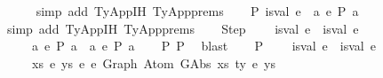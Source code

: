 \begin{isabellebody}
\ \ \ \ \isamarkupfalse%
\ {\isacharparenleft}{\kern0pt}simp\ add{\isacharcolon}{\kern0pt}\ TyApp{\isachardot}{\kern0pt}IH{\isacharparenleft}{\kern0pt}{}{\isacharparenright}{\kern0pt}\ TyApp{\isachardot}{\kern0pt}prems{\isacharparenright}{\kern0pt}\isanewline
\ \ \isamarkupfalse%
\ P{}{\isacharcolon}{\kern0pt}\ {\isachardoublequoteopen}is{\isacharunderscore}{\kern0pt}val\ e{}\ {\isasymor}\ {\isacharparenleft}{\kern0pt}{\isasymexists}a{\isachardot}{\kern0pt}\ e{}\ {\isacharminus}{\kern0pt}{\isachargreater}{\kern0pt}{\isacharbraceleft}{\kern0pt}P{\isacharbraceright}{\kern0pt}\ a{\isacharparenright}{\kern0pt}{\isachardoublequoteclose}\isanewline
\ \ \ \ \isamarkupfalse%
\ {\isacharparenleft}{\kern0pt}simp\ add{\isacharcolon}{\kern0pt}\ TyApp{\isachardot}{\kern0pt}IH{\isacharparenleft}{\kern0pt}{}{\isacharparenright}{\kern0pt}\ TyApp{\isachardot}{\kern0pt}prems{\isacharparenright}{\kern0pt}\isanewline
\isanewline
\ \ \isamarkupfalse%
\ Step{\isacharcolon}{\kern0pt}\isanewline
\ \ \ \ {\isachardoublequoteopen}{\isacharparenleft}{\kern0pt}is{\isacharunderscore}{\kern0pt}val\ e{}\ {\isasymand}\ is{\isacharunderscore}{\kern0pt}val\ e{}{\isacharparenright}{\kern0pt}\ {\isasymor}\isanewline
\ \ \ \ \ {\isacharparenleft}{\kern0pt}{\isasymexists}a{\isachardot}{\kern0pt}\ e{}\ {\isacharminus}{\kern0pt}{\isachargreater}{\kern0pt}{\isacharbraceleft}{\kern0pt}P{\isacharbraceright}{\kern0pt}\ a{\isacharparenright}{\kern0pt}\ {\isasymor}\ {\isacharparenleft}{\kern0pt}{\isasymexists}a{\isachardot}{\kern0pt}\ e{}\ {\isacharminus}{\kern0pt}{\isachargreater}{\kern0pt}{\isacharbraceleft}{\kern0pt}P{\isacharbraceright}{\kern0pt}\ a{\isacharparenright}{\kern0pt}{\isachardoublequoteclose}\isanewline
\ \ \isamarkupfalse%
\ P{}\ P{}\ \isamarkupfalse%
\ blast\isanewline
\isanewline
\ \ \isamarkupfalse%
\ P{}{\isacharcolon}{\kern0pt}\isanewline
\ \ \ \ {\isachardoublequoteopen}{\isacharparenleft}{\kern0pt}is{\isacharunderscore}{\kern0pt}val\ e{}\ {\isasymand}\ is{\isacharunderscore}{\kern0pt}val\ e{}{\isacharparenright}{\kern0pt}\ {\isacharequal}{\kern0pt}{\isacharequal}{\kern0pt}{\isachargreater}{\kern0pt}\isanewline
\ \ \ \ \ {\isasymexists}xs\ e{\isacharprime}{\kern0pt}\ ys{\isachardot}{\kern0pt}\ e{}\ {\isasymsimeq}e\ Graph\ {\isacharparenleft}{\kern0pt}Atom\ {\isacharparenleft}{\kern0pt}GAbs\ xs\ ty{}\ e{\isacharprime}{\kern0pt}{\isacharparenright}{\kern0pt}\ ys{\isacharparenright}{\kern0pt}{\isachardoublequoteclose}\isanewline

\end{isabellebody}
